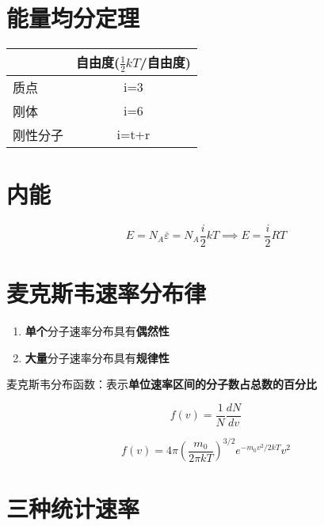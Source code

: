 \section{能量均分定理}

\begin{table}[!htbp]
    \centering
    \begin{tabular}{lc}
        \toprule
                 & 自由度($\frac{1}{2}kT$/自由度) \\
        \midrule
        质点     & i=3                            \\
        刚体     & i=6                            \\
        刚性分子 & i=t+r                          \\
        \bottomrule
    \end{tabular}
\end{table}

\section{内能}

\begin{equation}
    E=N_A\overline{\varepsilon{}}=N_A\frac{i}{2}kT\implies{E}=\frac{i}{2}RT
\end{equation}

\section{麦克斯韦速率分布律}

\begin{enumerate}
    \item \textbf{单个}分子速率分布具有\textbf{偶然性}
    \item \textbf{大量}分子速率分布具有\textbf{规律性}
\end{enumerate}

麦克斯韦分布函数：表示\textbf{单位速率区间的分子数占总数的百分比}

\begin{equation}
    f(v)=\frac{1}{N}\frac{dN}{dv}
\end{equation}

\begin{equation}
    f(v)=4\pi \left(\frac{m_0}{2\pi kT}\right)^{3/2}e^{-m_0v^2/2kT}v^2
\end{equation}

\section{三种统计速率}

